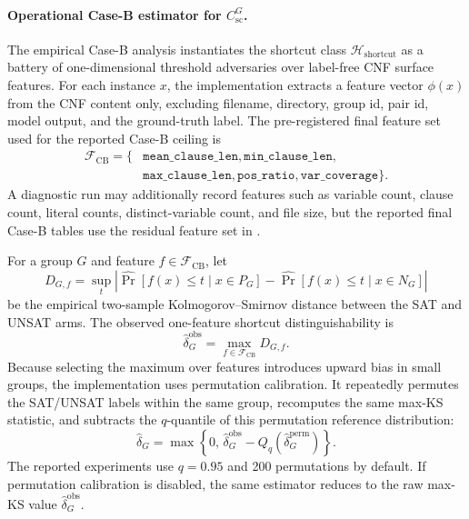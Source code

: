 \documentclass[conference]{IEEEtran}
\theoremstyle{remark}
\newcommand{\shortcutHypCls}{\mathcal{H}_{\mathrm{shortcut}}}
\newcommand{\shortcutCeiling}{C_{\mathrm{sc}}^{G}}
\begin{document}
\paragraph{Operational Case-B estimator for $\shortcutCeiling$.}
The empirical Case-B analysis instantiates the shortcut class
$\shortcutHypCls$ as a battery of one-dimensional threshold adversaries over
label-free CNF surface features. For each instance $x$, the implementation
extracts a feature vector $\phi(x)$ from the CNF content only, excluding filename,
directory, group id, pair id, model output, and the ground-truth label. The
pre-registered final feature set used for the reported Case-B ceiling is
\begingroup\small
\begin{equation}
\label{eq:caseb-feature-set}
\begin{aligned}
\mathcal{F}_{\mathrm{CB}}
=\{&
\texttt{mean\_clause\_len},
\texttt{min\_clause\_len},\\
&
\texttt{max\_clause\_len},
\texttt{pos\_ratio},
\texttt{var\_coverage}
\}.
\end{aligned}
\end{equation}
\endgroup
A diagnostic run may additionally record features such as variable count,
clause count, literal counts, distinct-variable count, and file size, but the
reported final Case-B tables use the residual feature set in
.

For a group $G$ and feature $f\in\mathcal{F}_{\mathrm{CB}}$, let
\begin{equation}\label{eq:caseb-ks-feature}
D_{G,f}
=
\sup_t
\left|
\widehat{\Pr}[f(x)\le t\mid x\in P_G]
-
\widehat{\Pr}[f(x)\le t\mid x\in N_G]
\right|
\end{equation}
be the empirical two-sample Kolmogorov--Smirnov distance between the SAT and
UNSAT arms. The observed one-feature shortcut distinguishability is
\begin{equation}\label{eq:caseb-delta-observed}
\hat\delta^{\mathrm{obs}}_G
=
\max_{f\in\mathcal{F}_{\mathrm{CB}}} D_{G,f}.
\end{equation}
Because selecting the maximum over features introduces upward bias in small
groups, the implementation uses permutation calibration. It repeatedly permutes
the SAT/UNSAT labels within the same group, recomputes the same max-KS statistic,
and subtracts the $q$-quantile of this permutation reference distribution:
\begin{equation}\label{eq:caseb-delta-calibrated}
\hat\delta_G
=
\max\left\{
0,\,
\hat\delta^{\mathrm{obs}}_G
-
Q_q\!\left(\hat\delta^{\mathrm{perm}}_G\right)
\right\}.
\end{equation}
The reported experiments use $q=0.95$ and 200 permutations by default. If
permutation calibration is disabled, the same estimator reduces to the raw
max-KS value $\hat\delta^{\mathrm{obs}}_G$.
\end{document}
